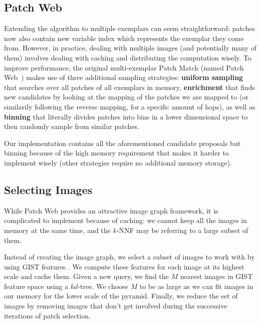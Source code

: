 
\subsection{Patch Web}
Extending the algorithm to multiple exemplars can seem straightforward: patches now also contain new variable index which represents the exemplar they come from.
However, in practice, dealing with multiple images (and potentially many of them) involves dealing with caching and distributing the computation wisely.
To improve performance, the original multi-exemplar Patch Match (named Patch Web~\cite{Barnes11}) makes use of three additional sampling strategies:
\textbf{uniform sampling} that searches over all patches of all exemplars in memory,
\textbf{enrichment} that finds new candidates by looking at the mapping of the patches we are mapped to (or similarily following the reverse mapping, for a specific amount of hops), as well as
\textbf{binning} that literally divides patches into bins in a lower dimensional space to then randomly sample from similar patches.

Our implementation contains all the aforementioned candidate proposals but binning because of the high memory requirement that makes it harder to implement wisely (other strategies require no additional memory storage).

\subsection{Selecting Images}
While Patch Web provides an attractive image graph framework, it is complicated to implement because of caching: we cannot keep all the images in memory at the same time, and the $k$-NNF may be referring to a large subset of them.

Instead of creating the image graph, we select a subset of images to work with by using GIST features \cite{Torralba08b}.
We compute these features for each image at its highest scale and cache them.
Given a new query, we find the $M$ nearest images in GIST feature space using a $kd$-tree.
We choose $M$ to be as large as we can fit images in our memory for the lower scale of the pyramid.
Finally, we reduce the set of images by removing images that don't get involved during the successive iterations of patch selection.